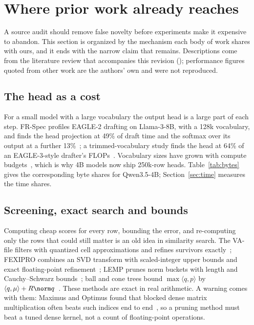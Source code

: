 \section{Where prior work already reaches}\label{sec:prior}
A source audit should remove false novelty before experiments make it expensive to abandon. This section is organized by the mechanism each body of work shares with ours, and it ends with the narrow claim that remains. Descriptions come from the literature review that accompanies this revision (); performance figures quoted from other work are the authors' own and were not reproduced.

\subsection{The head as a cost}
For a small model with a large vocabulary the output head is a large part of each step. FR-Spec profiles EAGLE-2 drafting on Llama-3-8B, with a 128k vocabulary, and finds the head projection at 49\% of draft time and the softmax over its output at a further 13\%~\cite{frspec}; a trimmed-vocabulary study finds the head at 64\% of an EAGLE-3-style drafter's FLOPs~\cite{benshoham2026}. Vocabulary sizes have grown with compute budgets~\cite{tao2024vocab}, which is why 4B models now ship 250k-row heads. Table~\ref{tab:bytes} gives the corresponding byte shares for Qwen3.5-4B; Section~\ref{sec:time} measures the time shares.

\subsection{Screening, exact search and bounds}\label{sec:prior-screening}
Computing cheap scores for every row, bounding the error, and re-computing only the rows that could still matter is an old idea in similarity search. The VA-file filters with quantized cell approximations and refines survivors exactly~\cite{vafile}; FEXIPRO combines an SVD transform with scaled-integer upper bounds and exact floating-point refinement~\cite{fexipro}; LEMP prunes norm buckets with length and Cauchy--Schwarz bounds~\cite{lemp}; ball and cone trees bound $\max\langle q,p\rangle$ by $\langle q,\mu\rangle+R\norm q$~\cite{ramgray2012}. These methods are exact in real arithmetic. A warning comes with them: Maximus and Optimus found that blocked dense matrix multiplication often beats such indices end to end~\cite{maximus}, so a pruning method must beat a tuned dense kernel, not a count of floating-point operations.

